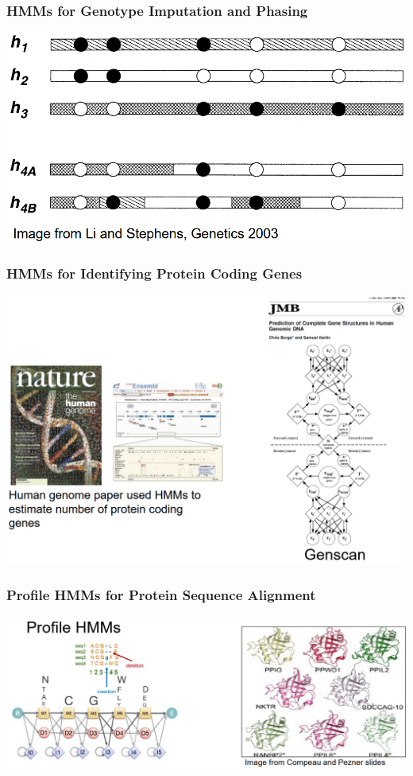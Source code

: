 \documentclass[10pt]{article}
\begin{document}
\subsubsection*{HMMs for Genotype Imputation and Phasing}
\begin{center} 
	\includegraphics*[width=\textwidth]{W9_2.png} 
\end{center}

\subsubsection*{HMMs for Identifying Protein Coding Genes}
\begin{center} 
	\includegraphics*[width=\textwidth]{W9_3.png} 
\end{center}

\subsubsection*{Profile HMMs for Protein Sequence Alignment}
\begin{center} 
	\includegraphics*[width=\textwidth]{W9_4.png} 
\end{center}
\end{document}
